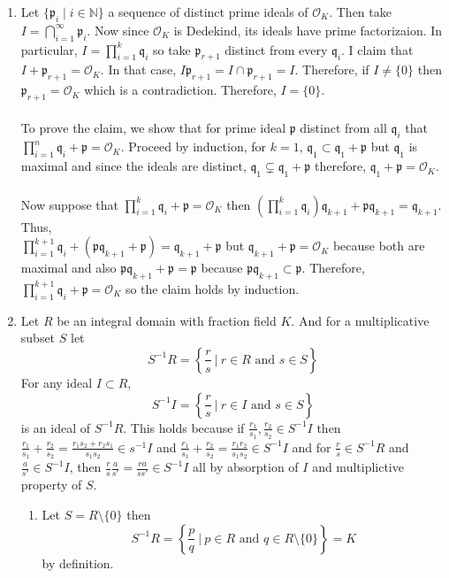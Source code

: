 \documentclass[12pt]{extarticle}
\newcommand{\N}{\mathbb{N}}
\newcommand{\ints}[1]{\mathcal{O}_{#1}}
\newcommand{\sm}{\! \setminus \!}
\begin{document}
\begin{enumerate}
\begin{enumerate}
\end{enumerate}
\item Let $\{\mathfrak{p}_i \mid i \in \N\}$ a sequence of distinct prime ideals of $\ints{K}$. Then take $I = \bigcap\limits_{i = 1}^\infty \mathfrak{p}_i$. Now since $\ints{K}$ is Dedekind, its ideals have prime factorizaion. In particular, $I = \prod\limits_{i = 1}^{k} \mathfrak{q}_i$ so take $\mathfrak{p}_{r+1}$ distinct from every $\mathfrak{q}_i$. I claim that $I + \mathfrak{p}_{r+1} = \ints{K}$. In that case, $I \mathfrak{p}_{r+1} = I \cap \mathfrak{p}_{r+1} = I$. Therefore, if $I \neq \{0\}$ then $\mathfrak{p}_{r+1} = \ints{K}$ which is a contradiction. Therefore, $I = \{0\}$.   \\ \\
To prove the claim, we show that for prime ideal $\mathfrak{p}$ distinct from all $\mathfrak{q}_i$ that $\prod\limits_{i = 1}^{n} \mathfrak{q}_i + \mathfrak{p} = \ints{K}$. Proceed by induction, for $k = 1$, $\mathfrak{q_1} \subset \mathfrak{q}_1 + \mathfrak{p}$ but $\mathfrak{q}_1$ is maximal and since the ideals are distinct, $\mathfrak{q}_1 \subsetneq \mathfrak{q}_1 + \mathfrak{p}$ therefore, $\mathfrak{q}_1 + \mathfrak{p} = \ints{K}$. \\ \\
Now suppose that $\prod\limits_{i = 1}^{k} \mathfrak{q}_i + \mathfrak{p} = \ints{K}$ then $\left( \prod\limits_{i = 1}^{k} \mathfrak{q}_i \right) \mathfrak{q}_{k+1} + \mathfrak{p} \mathfrak{q}_{k+1} = \mathfrak{q}_{k+1} $. Thus, \\
$\prod\limits_{i = 1}^{k+1} \mathfrak{q}_i + (\mathfrak{p} \mathfrak{q}_{k+1} + \mathfrak{p}) = \mathfrak{q}_{k+1} + \mathfrak{p}$ but $\mathfrak{q}_{k+1} + \mathfrak{p} = \ints{K}$ because both are maximal and also $\mathfrak{p} \mathfrak{q}_{k+1} + \mathfrak{p} = \mathfrak{p}$ because $\mathfrak{p} \mathfrak{q}_{k+1} \subset \mathfrak{p}$. Therefore, $\prod\limits_{i = 1}^{k+1} \mathfrak{q}_i + \mathfrak{p} = \ints{K}$ so the claim holds by induction. 

\item 
Let $R$ be an integral domain with fraction field $K$. And for a multiplicative subset $S$ let \[S^{-1} R = \left\{ \frac{r}{s} \: \big| \: r \in R \text{ and } s \in S \right\} \]
For any ideal $I \subset R$, \[S^{-1} I = \left\{ \frac{r}{s} \: \big| \: r \in I \text{ and } s \in S \right\} \] is an ideal of $S^{-1}R$. This holds because if $\frac{r_1}{s_1}, \frac{r_2}{s_2} \in S^{-1}I$ then $\frac{r_1}{s_1} + \frac{r_2}{s_2} = \frac{r_1 s_2 + r_2 s_1}{s_1 s_2} \in s^{-1}I$ and $\frac{r_1}{s_1} + \frac{r_2}{s_2} = \frac{r_1 r_2}{s_1 s_2} \in S^{-1} I$ and for $\frac{r}{s} \in S^{-1}R$ and $\frac{a}{s'} \in S^{-1}I$, then $\frac{r}{s} \frac{a}{s'} = \frac{ra}{ss'} \in S^{-1}I$ all by absorption of $I$ and multiplictive property of $S$.
\begin{enumerate}
\item Let $S = R \sm \{0\}$ then \[S^{-1} R = \left\{ \frac{p}{q} \: \big| \: p \in R \text{ and } q \in R \sm \{0\} \right\} = K\] by definition. 


\end{enumerate}
\end{enumerate}
\end{document}
